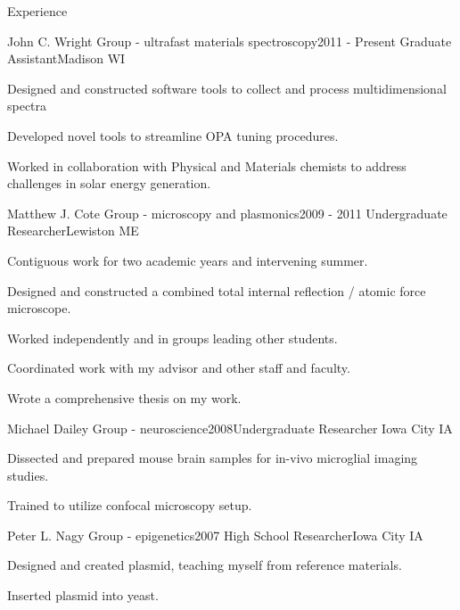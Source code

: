\documentclass{resume}  %
\begin{document}
\begin{rSection}{Experience}
  \begin{rSubsection}{John C. Wright Group - ultrafast materials spectroscopy}{2011 - Present}
    {Graduate Assistant}{Madison WI}
    \item Designed and constructed software tools to collect and process multidimensional spectra
    \item Developed novel tools to streamline OPA tuning procedures.
    \item Worked in collaboration with Physical and Materials chemists to address challenges in
      solar energy generation.
  \end{rSubsection}
  \begin{rSubsection}{Matthew J. Cote Group - microscopy and plasmonics}{2009 - 2011}
    {Undergraduate Researcher}{Lewiston ME}
    \item Contiguous work for two academic years and intervening summer.
    \item Designed and constructed a combined total internal reflection / atomic force microscope.
    \item Worked independently and in groups leading other students.
    \item Coordinated work with my advisor and other staff and faculty.
    \item Wrote a comprehensive thesis on my work.
  \end{rSubsection}
  \begin{rSubsection}{Michael Dailey Group - neuroscience}{2008}{Undergraduate Researcher}
    {Iowa City IA}
    \item Dissected and prepared mouse brain samples for in-vivo microglial imaging studies.
    \item Trained to utilize confocal microscopy setup.
  \end{rSubsection}
  \begin{rSubsection}{Peter L. Nagy Group - epigenetics}{2007}
    {High School Researcher}{Iowa City IA}
    \item Designed and created plasmid, teaching myself from reference materials.
    \item Inserted plasmid into yeast.
  \end{rSubsection}
\end{rSection}

\clearpage
\end{document}
